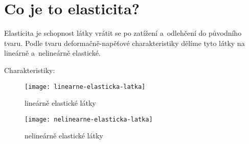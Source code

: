 
\section{Co je to elasticita?}
Elasticita je schopnost látky vrátit se po zatížení a~odlehčení do původního tvaru.
Podle tvaru deformačně-napěťové charakteristiky dělíme tyto látky na lineárně a~nelineárně elastické.

Charakteristiky:
\begin{figure}[H]
	\label{fig:linearne-elasticka-latka}
	\centering
	\texttt{[image: linearne-elasticka-latka]}
	\caption{lineárně elastické látky}
\end{figure}

\begin{figure}[H]
	\label{fig:nelinearne-elasticka-latka}
	\centering
	\texttt{[image: nelinearne-elasticka-latka]}
	\caption{nelineárně elastické látky}
\end{figure}
